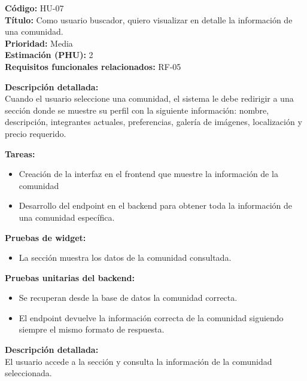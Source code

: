 \begin{tarjetaHU}
\textbf{Código:} HU-07 \\
\textbf{Título:} Como usuario buscador, quiero visualizar en detalle la información de una comunidad. \\
\textbf{Prioridad:} Media \\
\textbf{Estimación (PHU):} 2 \\
\textbf{Requisitos funcionales relacionados:} RF-05

\vspace{0.5em}
\textbf{Descripción detallada:} \\
Cuando el usuario seleccione una comunidad, el sistema le debe redirigir a una sección donde se muestre su perfil con la siguiente información: nombre, descripción, integrantes actuales, preferencias, galería de imágenes, localización y precio requerido.

\vspace{0.5em}
\textbf{Tareas:}
\begin{itemize}[left=0pt]
  \item Creación de la interfaz en el frontend que muestre la información de la comunidad
  \item Desarrollo del endpoint en el backend para obtener toda la información de una comunidad específica.
\end{itemize}

\vspace{0.5em}
\textbf{Pruebas de widget:}
\begin{itemize}[left=0pt]
  \item La sección muestra los datos de la comunidad consultada.
\end{itemize}
\textbf{Pruebas unitarias del backend:}
\begin{itemize}[left=0pt]
  \item Se recuperan desde la base de datos la comunidad correcta.
  \item El endpoint devuelve la información correcta de la comunidad siguiendo siempre el mismo formato de respuesta.
\end{itemize}
\textbf{Descripción detallada:} \\
El usuario accede a la sección y consulta la información de la comunidad seleccionada.
\end{tarjetaHU}

